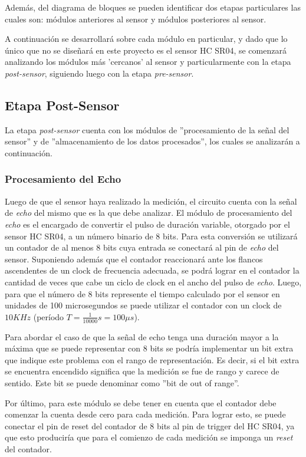 Además, del diagrama de bloques se pueden identificar dos etapas particulares
las cuales son: módulos anteriores al sensor y módulos posteriores
al sensor. 

A continuación se desarrollará sobre cada módulo en particular, y
dado que lo único que no se diseñará en este proyecto es el sensor
HC SR04, se comenzará analizando los módulos más 'cercanos' al
sensor y particularmente con la etapa \textit{post-sensor}, siguiendo
luego con la etapa \textit{pre-sensor}.

\subsection{Etapa Post-Sensor}

La etapa \textit{post-sensor} cuenta con los módulos de ''procesamiento
de la señal del sensor'' y de ''almacenamiento de los datos procesados'',
los cuales se analizarán a continuación.

\subsubsection{Procesamiento del Echo}

Luego de que el sensor haya realizado la medición, el circuito cuenta
con la señal de \textit{echo} del mismo que es la que debe analizar.
El módulo de procesamiento del \textit{echo} es el encargado de convertir
el pulso de duración variable, otorgado por el sensor HC SR04, a un
número binario de 8 bits. Para esta conversión se utilizará un contador
de al menos 8 bits cuya entrada se conectará al pin de \textit{echo}
del sensor. Suponiendo además que el contador reaccionará ante los
flancos ascendentes de un clock de frecuencia adecuada, se podrá lograr
en el contador la cantidad de veces que cabe un ciclo de clock en
el ancho del pulso de \textit{echo}. Luego, para que el número de 8 bits
represente el tiempo calculado por el sensor en unidades de 100 microsegundos
se puede utilizar el contador con un clock de $10KHz$ (período $T=\frac{1}{10000}s=100\mu s$).

Para abordar el caso de que la señal de echo tenga una duración mayor
a la máxima que se puede representar con 8 bits se podría implementar
un bit extra que indique este problema con el rango de representación.
Es decir, si el bit extra se encuentra encendido significa que la
medición se fue de rango y carece de sentido. Este bit se puede denominar
como ''bit de out of range''.

Por último, para este módulo se debe tener en cuenta que el contador
debe comenzar la cuenta desde cero para cada medición. Para lograr
esto, se puede conectar el pin de reset del contador de 8 bits al
pin de trigger del HC SR04, ya que esto produciría que para el comienzo
de cada medición se imponga un \textit{reset} del contador.\newline

